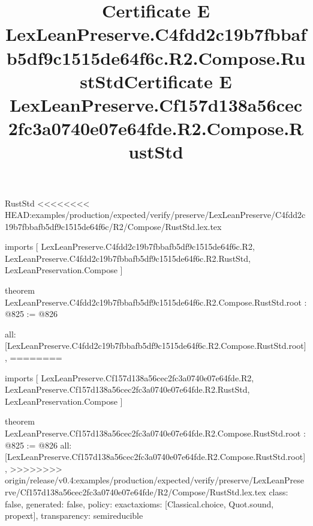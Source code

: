 \begin{lexlean}{RustStd}
<<<<<<<< HEAD:examples/production/expected/verify/preserve/LexLeanPreserve/C4fdd2c19b7fbbafb5df9c1515de64f6c/R2/Compose/RustStd.lex.tex
\title{Certificate E LexLeanPreserve.C4fdd2c19b7fbbafb5df9c1515de64f6c.R2.Compose.RustStd}
\begin{coremodule}
imports [
  LexLeanPreserve.C4fdd2c19b7fbbafb5df9c1515de64f6c.R2,
  LexLeanPreserve.C4fdd2c19b7fbbafb5df9c1515de64f6c.R2.RustStd,
  LexLeanPreservation.Compose
]

theorem LexLeanPreserve.C4fdd2c19b7fbbafb5df9c1515de64f6c.R2.Compose.RustStd.root : @825 := @826 {
  all: [LexLeanPreserve.C4fdd2c19b7fbbafb5df9c1515de64f6c.R2.Compose.RustStd.root],
========
\title{Certificate E LexLeanPreserve.Cf157d138a56cec2fc3a0740e07e64fde.R2.Compose.RustStd}
\begin{coremodule}
imports [
  LexLeanPreserve.Cf157d138a56cec2fc3a0740e07e64fde.R2,
  LexLeanPreserve.Cf157d138a56cec2fc3a0740e07e64fde.R2.RustStd,
  LexLeanPreservation.Compose
]

theorem LexLeanPreserve.Cf157d138a56cec2fc3a0740e07e64fde.R2.Compose.RustStd.root : @825 := @826 {
  all: [LexLeanPreserve.Cf157d138a56cec2fc3a0740e07e64fde.R2.Compose.RustStd.root],
>>>>>>>> origin/release/v0.4:examples/production/expected/verify/preserve/LexLeanPreserve/Cf157d138a56cec2fc3a0740e07e64fde/R2/Compose/RustStd.lex.tex
  class: false,
  generated: false,
  policy: exact{axioms: [Classical.choice, Quot.sound, propext]},
  transparency: semireducible
}


\end{coremodule}}
\end{coremodule}
\end{lexlean}
